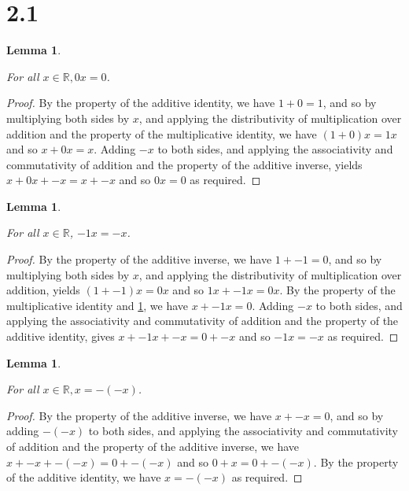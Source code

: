 \documentclass{article}
\theoremstyle{plain}
\newtheorem{lem}[thm]{Lemma}
\begin{document}
\section*{2.1}

\begin{lem}
    \label{lem_0_mult}

    For all $x \in \mathbb{R}, 0x = 0$.
\end{lem}

\begin{proof}
    By the property of the additive identity, we have $1 + 0 = 1$, and so by multiplying both sides by $x$, and applying the distributivity of multiplication over addition and the property of the multiplicative identity, we have $(1 + 0)x = 1x$ and so $x + 0x = x$. Adding $-x$ to both sides, and applying the associativity and commutativity of addition and the property of the additive inverse, yields $x + 0x + -x = x + -x$ and so $0x = 0$ as required.
\end{proof}

\begin{lem}
    \label{lem_minus_1_neg}

    For all $x \in \mathbb{R}$, $-1x = -x$.
\end{lem}

\begin{proof}
    By the property of the additive inverse, we have $1 + -1 = 0$, and so by multiplying both sides by $x$, and applying the distributivity of multiplication over addition, yields $(1 + -1)x = 0x$ and so $1x + -1x = 0x$. By the property of the multiplicative identity and \cref{lem_0_mult}, we have $x + -1x = 0$. Adding $-x$ to both sides, and applying the associativity and commutativity of addition and the property of the additive identity, gives $x + -1x + -x = 0 + -x$ and so $-1x = -x$ as required.
\end{proof}

\begin{lem}
    \label{lem_double_neg}

    For all $x \in \mathbb{R}, x = -(-x)$.
\end{lem}

\begin{proof}
    By the property of the additive inverse, we have $x + -x = 0$, and so by adding $-(-x)$ to both sides, and applying the associativity and commutativity of addition and the property of the additive inverse, we have $x + -x + -(-x) = 0 + -(-x)$ and so $0 + x = 0 + -(-x)$. By the property of the additive identity, we have $x = -(-x)$ as required.
\end{proof}
\end{document}
